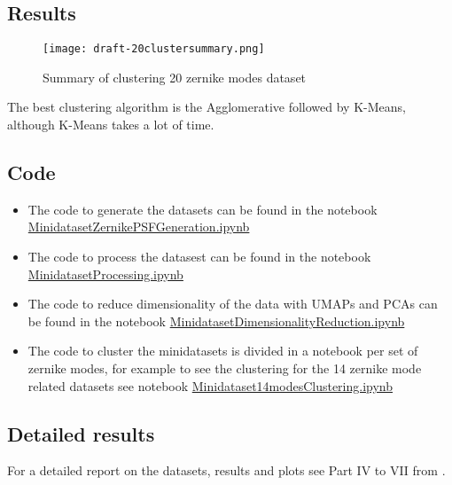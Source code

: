 	\subsection{Results}
	
		\begin{figure*}[ht!]
			\centering
			\texttt{[image: 
		draft-20clustersummary.png]}
			\caption{Summary of clustering 20 zernike modes dataset}
		\end{figure*}
		\FloatBarrier
		
		The best clustering algorithm is the Agglomerative followed by K-Means, although K-Means takes a lot of time.
	
	
	\subsection{Code}

		\begin{itemize}
			\item The code to generate the datasets can be found in the notebook \href{https://github.com/Dacarpe03/PLImageReconstruction/blob/main/PSFReconstruction/DataNotebooks/MinidatasetZernikePSFGeneration.ipynb}{MinidatasetZernikePSFGeneration.ipynb}
			\item The code to process the datasest can be found in the notebook \href{https://github.com/Dacarpe03/PLImageReconstruction/blob/main/PSFReconstruction/DataNotebooks/MinidatasetProcessing.ipynb}{MinidatasetProcessing.ipynb}
			\item The code to reduce dimensionality of the data with UMAPs and PCAs can be found in the notebook \href{https://github.com/Dacarpe03/PLImageReconstruction/blob/main/PSFReconstruction/DataNotebooks/MinidatasetDimensionalityReduction.ipynb}{MinidatasetDimensionalityReduction.ipynb}
			\item The code to cluster the minidatasets is divided in a notebook per set of zernike modes, for example to see the clustering for the 14 zernike mode related datasets see notebook \href{https://github.com/Dacarpe03/PLImageReconstruction/blob/main/PSFReconstruction/DataNotebooks/Minidataset14modesClustering.ipynb}{Minidataset14modesClustering.ipynb}
		\end{itemize}
		
		
	\subsection{Detailed results}
	
		For a detailed report on the datasets, results and plots see Part IV to VII from .